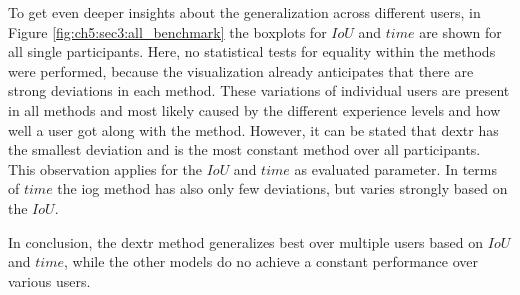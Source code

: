 To get even deeper insights about the generalization across different users, in Figure \ref{fig:ch5:sec3:all_benchmark} the boxplots for $ IoU $ and $ time $ are shown for all single participants.
Here, no statistical tests for equality within the methods were performed, because the visualization already anticipates that there are strong deviations in each method.
These variations of individual users are present in all methods and most likely caused by the different experience levels and how well a user got along with the method.
However, it can be stated that \gls{dextr} has the smallest deviation and is the most constant method over all participants.
This observation applies for the $ IoU $ and $ time $ as evaluated parameter.
In terms of $ time $ the \gls{iog} method has also only few deviations, but varies strongly based on the $ IoU $.

In conclusion, the \gls{dextr} method generalizes best over multiple users based on $ IoU $ and $ time $, while the other models do no achieve a constant performance over various users.

